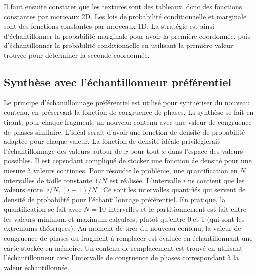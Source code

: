 %
%
%

Il faut ensuite constater que les textures sont des tableaux, donc des fonctions constantes par morceaux 2D. Les lois de probabilité conditionnelle et marginale sont des fonctions constantes par morceaux 1D. La stratégie est ainsi d'échantillonner la probabilité marginale pour avoir la première coordonnée, puis d'échantillonner la probabilité conditionnelle en utilisant la première valeur trouvée pour déterminer la seconde coordonnée.

\subsection{Synthèse avec l'échantillonneur préférentiel}

Le principe d'échantillonnage préférentiel est utilisé pour synthétiser du nouveau contenu, en préservant la fonction de congruence de phases. La synthèse se fait en tirant, pour chaque fragment, un nouveau contenu avec une valeur de congruence de phases similaire. L'idéal serait d'avoir une fonction de densité de probabilité adaptée pour chaque valeur. La fonction de densité idéale privilégierait l'échantillonnage des valeurs autour de $x$ pour tout $x$ dans l'espace des valeurs possibles. Il est cependant compliqué de stocker une fonction de densité pour une mesure à valeurs continues. Pour résoudre le problème, une quantification en $N$ intervalles de taille constante $1/N$ est réalisée. L'intervalle $i$ ne contient que les valeurs entre $[i/N, (i+1)/N[$. Ce sont les intervalles quantifiés qui servent de densité de probabilité pour l'échantillonnage préférentiel. En pratique, la quantification se fait avec $N=10$ intervalles et le partitionnement est fait entre les valeurs minimum et maximum calculées, plutôt qu'entre 0 et 1 (qui sont les extremums théoriques). Au moment de tirer du nouveau contenu, la valeur de congruence de phases du fragment à remplacer est évaluée en échantillonnant une carte stockée en mémoire. Un contenu de remplacement est trouvé en utilisant l'échantillonneur avec l'intervalle de congruence de phases correspondant à la valeur échantillonnée.

